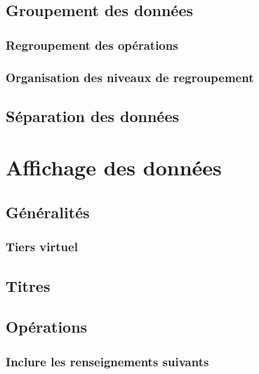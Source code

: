 \subsection{Groupement des données\label{reportscreation-organisation-group}}


\subsubsection{Regroupement des opérations\label{reportscreation-organisation-group-operations}}

\subsubsection{Organisation des niveaux de regroupement\label{reportscreation-organisation-group-levels}}

\subsection{Séparation des données\label{reportscreation-organisation-separation}}

\section{Affichage des données\label{reportscreation-display}}


\subsection{Généralités\label{reportscreation-display-general}}


\subsubsection{Tiers virtuel\label{reportscreation-display-general-virtualThird}}


\subsection{Titres\label{reportscreation-display-titles}}


\subsection{Opérations\label{reportscreation-display-transactions}}

\subsubsection{Inclure les renseignements suivants}


